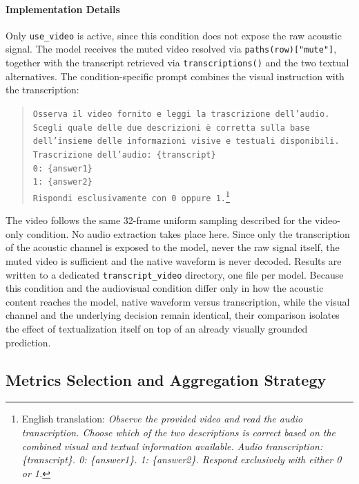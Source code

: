 \paragraph{Implementation Details}
Only \texttt{use\_video} is active, since this condition does not expose the raw acoustic signal. The model receives the muted video resolved via \texttt{paths(row)["mute"]}, together with the transcript retrieved via \texttt{transcriptions()} and the two textual alternatives. The condition-specific prompt combines the visual instruction with the transcription:
\begin{quote}
\small
\texttt{Osserva il video fornito e leggi la trascrizione dell'audio.}\\
\texttt{Scegli quale delle due descrizioni è corretta sulla base}\\
\texttt{dell'insieme delle informazioni visive e testuali disponibili.}\\[0.5em]
\texttt{Trascrizione dell'audio: \{transcript\}}\\[0.5em]
\texttt{0: \{answer1\}}\\
\texttt{1: \{answer2\}}\\[0.5em]
\texttt{Rispondi esclusivamente con 0 oppure 1.}\footnote{English translation: \textit{Observe the provided video and read the audio transcription. Choose which of the two descriptions is correct based on the combined visual and textual information available. Audio transcription: \{transcript\}. 0: \{answer1\}. 1: \{answer2\}. Respond exclusively with either 0 or 1.}}
\end{quote}
The video follows the same 32-frame uniform sampling described for the video-only condition. No audio extraction takes place here. Since only the transcription of the acoustic channel is exposed to the model, never the raw signal itself, the muted video is sufficient and the native waveform is never decoded.
Results are written to a dedicated \texttt{transcript\_video} directory, one file per model. Because this condition and the audiovisual condition differ only in how the acoustic content reaches the model, native waveform versus transcription, while the visual channel and the underlying decision remain identical, their comparison isolates the effect of textualization itself on top of an already visually grounded prediction.
\subsection*{Metrics Selection and Aggregation Strategy}
